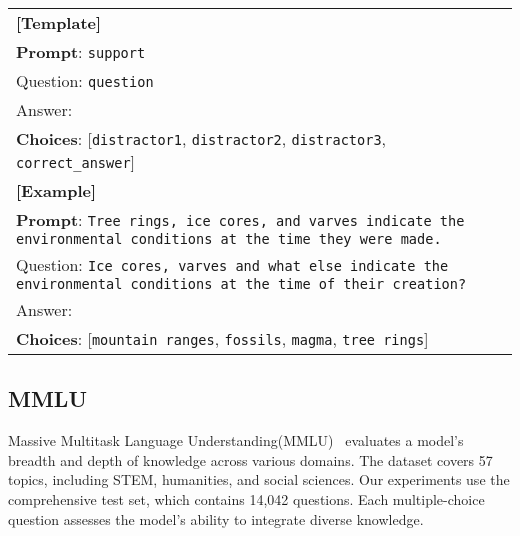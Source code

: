 \begin{table}[H]
\centering
\begin{small}
\begin{tabular}{|p{7cm}|}
\hline \textbf{[Template]} \\
\textbf{Prompt}: \texttt{support}\\
Question: \texttt{question}
\\Answer: \\
\textbf{Choices}: [\texttt{distractor1}, \texttt{distractor2}, \texttt{distractor3}, \texttt{correct\_answer}] \\
\hline \textbf{[Example]} \\
\textbf{Prompt}: \texttt{Tree rings, ice cores, and varves indicate the environmental conditions at the time they were made.}\\Question: \texttt{Ice cores, varves and what else indicate the environmental conditions at the time of their creation?}\\Answer: \\
\textbf{Choices}: [\texttt{mountain ranges}, \texttt{fossils}, \texttt{magma}, \texttt{tree rings}] \\ \hline
\end{tabular}
\end{small}
\end{table}

\newpage
\subsection{MMLU}

Massive Multitask Language Understanding(MMLU)~\cite{hendrycks2020measuring} evaluates a model's breadth and depth of knowledge across various domains. The dataset covers 57 topics, including STEM, humanities, and social sciences. Our experiments use the comprehensive test set, which contains 14,042 questions. Each multiple-choice question assesses the model's ability to integrate diverse knowledge.

